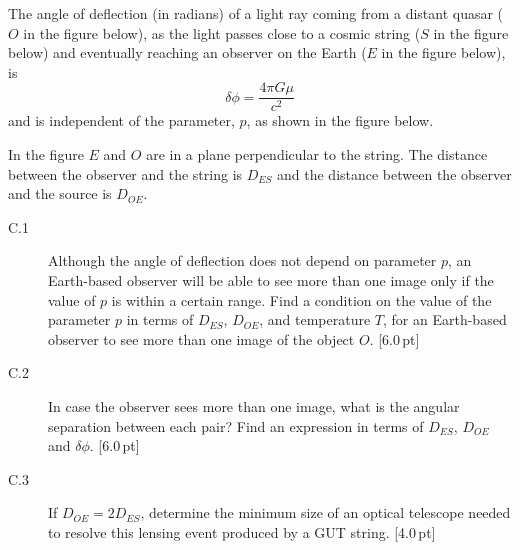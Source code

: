 The angle of deflection (in radians) of a light ray coming from a distant
quasar ($O$ in the figure below), as the light passes close to a cosmic string
($S$ in the figure below) and eventually reaching an observer on the Earth
($E$ in the figure below), is
\[ \delta\phi = \frac{4\pi G\mu}{c^2} \]
and is independent of the parameter, $p$, as shown in the figure below.

In the figure $E$ and $O$ are in a plane perpendicular to the string. The
distance between the observer and the string is $D_{ES}$ and the distance
between the observer and the source is $D_{OE}$.


\begin{description}
\item[C.1] Although the angle of deflection does not depend on parameter $p$,
  an Earth-based observer will be able to see more than one image only if the
  value of $p$ is within a certain range. Find a condition on the value of the
  parameter $p$ in terms of $D_{ES}$, $D_{OE}$, and temperature $T$, for an
  Earth-based observer to see more than one image of the object $O$.
  \hfill[6.0\,pt]
\item[C.2] In case the observer sees more than one image, what is the angular
  separation between each pair? Find an expression in terms of $D_{ES}$,
  $D_{OE}$ and $\delta\phi$. \hfill[6.0\,pt]
\item[C.3] If $D_{OE} = 2D_{ES}$, determine the minimum size of an optical
  telescope needed to resolve this lensing event produced by a GUT string.
  \hfill[4.0\,pt]
\end{description}
